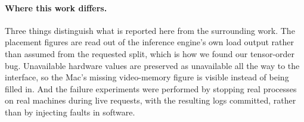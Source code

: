 \paragraph{Where this work differs.}
Three things distinguish what is reported here from the surrounding work. The
placement figures are read out of the inference engine's own load output rather
than assumed from the requested split, which is how we found our tensor-order
bug. Unavailable hardware values are preserved as unavailable all the way to the
interface, so the Mac's missing video-memory figure is visible instead of being
filled in. And the failure experiments were performed by stopping real processes
on real machines during live requests, with the resulting logs committed, rather
than by injecting faults in software.
